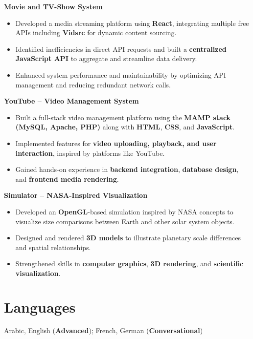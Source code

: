 \documentclass[a4paper,12pt]{article}
\begin{document}
\noindent\textbf{Movie and TV-Show System}\\[-1.2em]
\begin{itemize}[nosep]
    \item Developed a media streaming platform using \textbf{React}, integrating multiple free APIs including \textbf{Vidsrc} for dynamic content sourcing.
    \item Identified inefficiencies in direct API requests and built a \textbf{centralized JavaScript API} to aggregate and streamline data delivery.
    \item Enhanced system performance and maintainability by optimizing API management and reducing redundant network calls.
\end{itemize}
\noindent\textbf{YouTube – Video Management System}\\[-1.2em]
\begin{itemize}[nosep]
    \item Built a full-stack video management platform using the \textbf{MAMP stack (MySQL, Apache, PHP)} along with \textbf{HTML}, \textbf{CSS}, and \textbf{JavaScript}.
    \item Implemented features for \textbf{video uploading, playback, and user interaction}, inspired by platforms like YouTube.
    \item Gained hands-on experience in \textbf{backend integration}, \textbf{database design}, and \textbf{frontend media rendering}.
\end{itemize}

\noindent\textbf{Simulator – NASA-Inspired Visualization}\\[-1.2em]
\begin{itemize}[nosep]
    \item Developed an \textbf{OpenGL}-based simulation inspired by NASA concepts to visualize size comparisons between Earth and other solar system objects.
    \item Designed and rendered \textbf{3D models} to illustrate planetary scale differences and spatial relationships.
    \item Strengthened skills in \textbf{computer graphics}, \textbf{3D rendering}, and \textbf{scientific visualization}.
\end{itemize}

\vspace{-1.9em}
\section*{Languages}
\vspace{-0.7em}
Arabic, English (\textbf{Advanced}); French, German (\textbf{Conversational})
\end{document}
